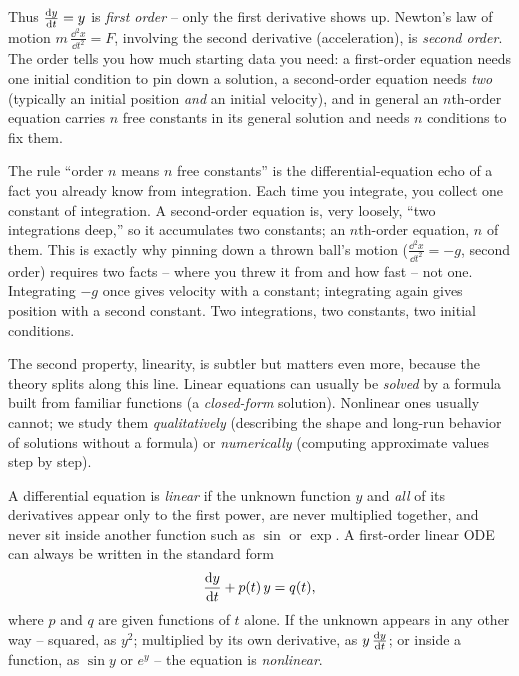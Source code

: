 Thus $\frac{\mathrm{d} y}{\mathrm{d} t} = y$ is \emph{first order} -- only the first derivative shows up. Newton's law of motion $m\,\frac{\dd^2 x}{\dd t^2} = F$, involving the second derivative (acceleration), is \emph{second order}. The order tells you how much starting data you need: a first-order equation needs one initial condition to pin down a solution, a second-order equation needs \emph{two} (typically an initial position \emph{and} an initial velocity), and in general an $n$th-order equation carries $n$ free constants in its general solution and needs $n$ conditions to fix them.

\begin{connectionbox}
The rule ``order $n$ means $n$ free constants'' is the differential-equation echo of a fact you already know from integration. Each time you integrate, you collect one constant of integration. A second-order equation is, very loosely, ``two integrations deep,'' so it accumulates two constants; an $n$th-order equation, $n$ of them. This is exactly why pinning down a thrown ball's motion ($\frac{\dd^2 x}{\dd t^2} = -g$, second order) requires two facts -- where you threw it from and how fast -- not one. Integrating $-g$ once gives velocity with a constant; integrating again gives position with a second constant. Two integrations, two constants, two initial conditions.
\end{connectionbox}

The second property, linearity, is subtler but matters even more, because the theory splits along this line. Linear equations can usually be \emph{solved} by a formula built from familiar functions (a \emph{closed-form} solution). Nonlinear ones usually cannot; we study them \emph{qualitatively} (describing the shape and long-run behavior of solutions without a formula) or \emph{numerically} (computing approximate values step by step).

\begin{definition}
\label{ch36:def-linear}
A differential equation is \emph{linear} if the unknown function $y$ and \emph{all} of its derivatives appear only to the first power, are never multiplied together, and never sit inside another function such as $\sin$ or $\exp$. A first-order linear ODE can always be written in the standard form
\[
  \frac{\mathrm{d} y}{\mathrm{d} t} + p(t)\,y = q(t),
\]
where $p$ and $q$ are given functions of $t$ alone. If the unknown appears in any other way -- squared, as $y^2$; multiplied by its own derivative, as $y\,\frac{\mathrm{d} y}{\mathrm{d} t}$; or inside a function, as $\sin y$ or $e^{y}$ -- the equation is \emph{nonlinear}.
\end{definition}

